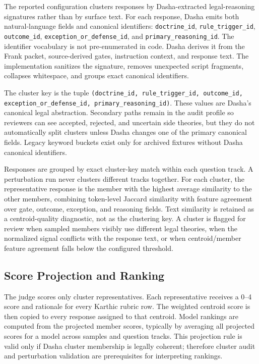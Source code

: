 The reported configuration clusters responses by Dasha-extracted
legal-reasoning signatures rather than by surface text. For each response,
Dasha emits both natural-language fields and canonical identifiers:
\texttt{doctrine\_id}, \texttt{rule\_trigger\_id}, \texttt{outcome\_id},
\texttt{exception\_or\_defense\_id}, and \texttt{primary\_reasoning\_id}. The
identifier vocabulary is not pre-enumerated in code. Dasha derives it from the
Frank packet, source-derived gates, instruction context, and response text.
The implementation sanitizes the signature, removes unexpected script
fragments, collapses whitespace, and groups exact canonical identifiers.

The cluster key is the tuple
\texttt{(doctrine\_id, rule\_trigger\_id, outcome\_id,
exception\_or\_defense\_id, primary\_reasoning\_id)}. These values are Dasha's
canonical legal abstraction. Secondary paths remain in the audit profile so
reviewers can see accepted, rejected, and uncertain side theories, but they do
not automatically split clusters unless Dasha changes one of the primary
canonical fields. Legacy keyword buckets exist only for archived fixtures
without Dasha canonical identifiers.

Responses are grouped by exact cluster-key match within each question track. A
perturbation run never clusters different tracks together. For each cluster, the
representative response is the member with the highest average similarity to the
other members, combining token-level Jaccard similarity with feature agreement
over gate, outcome, exception, and reasoning fields. Text similarity is retained
as a centroid-quality diagnostic, not as the clustering key. A cluster is flagged
for review when sampled members visibly use different legal theories, when the
normalized signal conflicts with the response text, or when centroid/member
feature agreement falls below the configured threshold.

\subsection{Score Projection and Ranking}

The judge scores only cluster representatives. Each representative receives a
0--4 score and rationale for every Karthic rubric row. The weighted centroid
score is then copied to every response assigned to that centroid. Model rankings
are computed from the projected member scores, typically by averaging all
projected scores for a model across samples and question tracks. This projection
rule is valid only if Dasha cluster membership is legally coherent; therefore
cluster audit and perturbation validation are prerequisites for interpreting
rankings.
